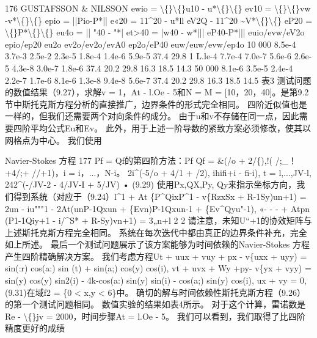 \documentclass[UTF8,11pt,a4paper,openany,fontset=fandol]{ctexbook}
\begin{document}
176 GUSTAFSSON \& NILSSON ewio = \textbackslash\{\}\textbackslash\{\}u10 - u*\textbackslash\{\}\textbackslash\{\} ev10 = \textbackslash\{\}\textbackslash\{\}vw -v*\textbackslash\{\}\textbackslash\{\} epio = ||Pio-P*|| e«20 = 11\textasciicircum{}20 - u*ll eV2Q - 11\textasciicircum{}20 \textasciitilde{}V*\textbackslash\{\}\textbackslash\{\} eP20 = \textbackslash\{\}P*\textbackslash\{\}\textbackslash\{\} eu4o = || "40 - "*| et>40 = |w40 - w*||| eP40-P*||| euio/evw/eV2o epio/ep20 eu2o ev2o/ev2o/evA0 ep2o/eP40 euw/euw/evw/ep4o 10 000 8.5e-4 3.7e-3 2.5e-2 2.3e-5 1.8e-4 1.4e-6 5.9e-5 37.4 29.8 1 L.le-4 7.7e-4 7.0e-7 5.6e-6 2.6e-5 4.3e-8 3.0e-7 1.8e-6 37.4 20.2 29.8 16.3 18.5 14.3 50 000 8.1e-6 3.5e-5 2.4e-4 2.2e-7 1.7e-6 8.1e-6 1.3e-8 9.4e-8 5.6e-7 37.4 20.2 29.8 16.3 18.5 14.5 表3 测试问题的数值结果（9.27），求解v = 1，At - l.Oe - 5和N = M = [10，20，40]。是第9.2节中斯托克斯方程分析的直接推广，边界条件的形式完全相同。 四阶近似值也是一样的，但我们还需要两个对向条件的成分。 由于u和v不存储在同一点，因此需要四阶平均公式Eu和Ev。 此外，用于上述一阶导数的紧致方案必须修改，使其以网格点为中心。 我们使用

Navier-Stokes 方程 177 Pf = Qf的第四阶方法：Pf Qf = \&(/o + 2/\{),!( /;\_！ +4/;+ //+1)，i = i，...，N-i。 2i\textasciicircum{}(-5/o + 4/1 + /2), ihifi+i - fi-i), t = l,...,JV-l, 242\textasciicircum{}(-/JV-2 - 4/JV-I + 5/JV) • (9.29) 使用Px,QX,Py, Qy来指示坐标方向，我们得到系统（对应于（9.24）l\textasciicircum{}1 + At \{P\textasciicircum{}QixP\textasciicircum{}1 - v\{RzxSx + R-1Sy)un+1) = 2un - iu"""1 - 2At(unP-1Qxun + \{Evn)P-1Qxun-1 + \{Ev\textasciicircum{}Qyu"-1), «- - - + Atpn (P1-1Qiy+1 - i/\textasciicircum{}S* + R-Sy)vn+1) = 3„n+l 2 2 请注意，未知U“+1的协效矩阵与上述斯托克斯方程完全相同。 系统在每次迭代中都由真正的边界条件补充，完全如上所述。 最后一个测试问题展示了该方案能够为时间依赖的Navier-Stokes 方程产生四阶精确解决方案。 我们考虑方程Ut + uux + vuy + px - v\{uxx + uyy) = sin(:r) cos(a:) sin (t) + sin(a;) cos(y) cos(i), vt + uvx + Wy +py- v\{yx + vyy) = sin(y) cos(y) sin2(i) - 4k-cos(a:) sin(y) sin(i) - cos(a;) sin(y) cos(i), ux + vy = 0, (9.31)在域f2 = \{0 < x,y < 6\}中。 确切的解与时间依赖性斯托克斯方程（9.26）的第一个测试问题相同。 数值实验的结果如表4所示。 对于这个计算，雷诺数是Re - \textbackslash\{\}jv = 2000，时间步骤At = l.Oe - 5。 我们可以看到，我们取得了比四阶精度更好的成绩
\end{document}
